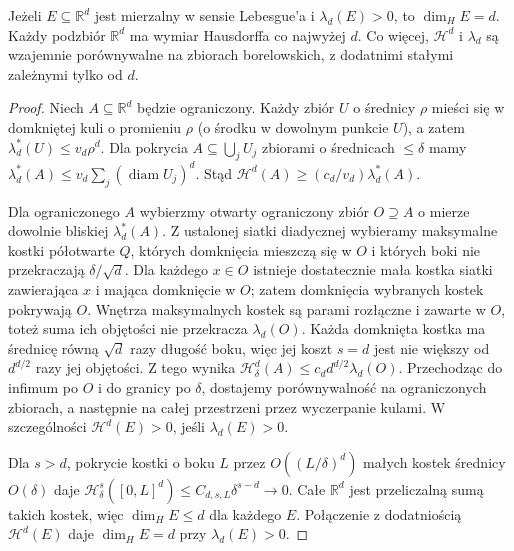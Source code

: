 \begin{twierdzenie}
\label{thm:euclidean-dimension-26}
Jeżeli $E\subseteq\mathbb R^d$ jest mierzalny
w sensie Lebesgue'a i $\lambda_d(E)>0$, to $\dim_HE=d$. Każdy podzbiór
$\mathbb R^d$ ma wymiar Hausdorffa co najwyżej $d$.
Co więcej, $\mathcal H^d$ i $\lambda_d$ są wzajemnie
porównywalne na zbiorach borelowskich, z dodatnimi
stałymi zależnymi tylko od $d$.
\end{twierdzenie}
\begin{proof}
Niech $A\subseteq\mathbb R^d$ będzie ograniczony.
Każdy zbiór $U$ o średnicy $\rho$ mieści się w domkniętej
kuli o promieniu $\rho$ (o środku w dowolnym punkcie $U$),
a zatem $\lambda_d^*(U)\le v_d\rho^d$.
Dla pokrycia $A\subseteq\bigcup_jU_j$ zbiorami o
średnicach $\le\delta$ mamy
$\lambda_d^*(A)\le v_d\sum_j(\operatorname{diam}U_j)^d$.
Stąd $\mathcal H^d(A)\ge(c_d/v_d)\lambda_d^*(A)$.

Dla ograniczonego $A$ wybierzmy otwarty ograniczony
zbiór $O\supseteq A$ o mierze dowolnie bliskiej
$\lambda_d^*(A)$. Z ustalonej siatki diadycznej wybieramy maksymalne
kostki półotwarte $Q$, których domknięcia mieszczą się
w $O$ i których boki nie przekraczają $\delta/\sqrt d$.
Dla każdego $x\in O$ istnieje dostatecznie mała kostka
siatki zawierająca $x$ i mająca domknięcie w $O$;
zatem domknięcia wybranych kostek pokrywają $O$.
Wnętrza maksymalnych kostek są parami rozłączne
i zawarte w $O$, toteż suma ich objętości nie
przekracza $\lambda_d(O)$. Każda domknięta kostka
ma średnicę równą $\sqrt d$ razy długość boku,
więc jej koszt $s=d$ jest nie większy od $d^{d/2}$
razy jej objętości. Z tego wynika
$\mathcal H^d_\delta(A)\le c_dd^{d/2}\lambda_d(O)$.
Przechodząc do infimum po $O$ i do granicy po $\delta$,
dostajemy porównywalność na ograniczonych zbiorach,
a następnie na całej przestrzeni przez wyczerpanie
kulami. W szczególności $\mathcal H^d(E)>0$, jeśli
$\lambda_d(E)>0$.

Dla $s>d$, pokrycie kostki o boku $L$ przez
$O((L/\delta)^d)$ małych kostek średnicy $O(\delta)$
daje $\mathcal H^s_\delta([0,L]^d)
\le C_{d,s,L}\delta^{s-d}\to0$.
Całe $\mathbb R^d$ jest przeliczalną sumą takich
kostek, więc $\dim_HE\le d$ dla każdego $E$.
Połączenie z dodatniością $\mathcal H^d(E)$ daje
$\dim_HE=d$ przy $\lambda_d(E)>0$.
\end{proof}

